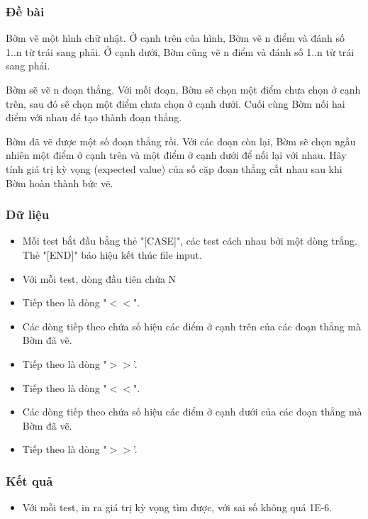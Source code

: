 



\subsubsection{   Đề bài  }

   Bờm vẽ một hình chữ nhật. Ở cạnh trên của hình, Bờm vẽ n điểm và đánh số 1..n từ trái sang phải. Ở cạnh dưới, Bờm cũng vẽ n điểm và đánh số 1..n từ trái sang phải.  

   Bờm sẽ vẽ n đoạn thẳng. Với mỗi đoạn, Bờm sẽ chọn một điểm chưa chọn ở cạnh trên, sau đó sẽ chọn một điểm chưa chọn ở cạnh dưới. Cuối cùng Bờm nối hai điểm với nhau để tạo thành đoạn thẳng.  

   Bờm đã vẽ được một số đoạn thẳng rồi. Với các đoạn còn lại, Bờm sẽ chọn ngẫu nhiên một điểm ở cạnh trên và một điểm ở cạnh dưới để nối lại với nhau. Hãy tính giá trị kỳ vọng (expected value) của số cặp đoạn thẳng cắt nhau sau khi Bờm hoàn thành bức vẽ.  

\subsubsection{   Dữ liệu  }
\begin{itemize}
	\item     Mỗi test bắt đầu bằng thẻ "[CASE]", các test cách nhau bởi một dòng trắng. Thẻ "[END]" báo hiệu kết thúc file input.   
	\item     Với mỗi test, dòng đầu tiên chứa N   
	\item     Tiếp theo là dòng "$<$$<$".   
	\item     Các dòng tiếp theo chứa số hiệu các điểm ở cạnh trên của các đoạn thẳng mà Bờm đã vẽ.   
	\item     Tiếp theo là dòng "$>$$>$'.   
	\item     Tiếp theo là dòng "$<$$<$".   
	\item     Các dòng tiếp theo chứa số hiệu các điểm ở cạnh dưới của các đoạn thẳng mà Bờm đã vẽ.   
	\item     Tiếp theo là dòng "$>$$>$'.   
\end{itemize}

\subsubsection{   Kết quả  }
\begin{itemize}
	\item     Với mỗi test, in ra giá trị kỳ vọng tìm được, với sai số không quá 1E-6.   
\end{itemize}

